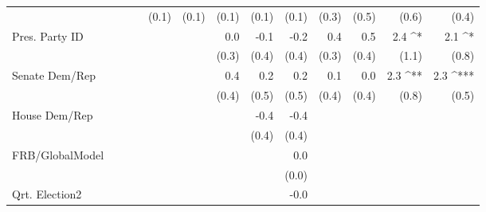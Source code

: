 \documentclass[a4paper]{article}\usepackage{graphicx, color}
\begin{document}
\begin{table}[ht]
\begin{center}
{\begin{tabular}{ l D{.}{.}{1}D{.}{.}{1}D{.}{.}{1}D{.}{.}{1}D{.}{.}{1}D{.}{.}{1}D{.}{.}{1}D{.}{.}{1}D{.}{.}{1}D{.}{.}{1}D{.}{.}{1}D{.}{.}{1} }
                     &                 &                 &                 & (0.1)           & (0.1)           & (0.1)           & (0.1)           & (0.1)           & (0.3)           & (0.5)           & (0.6)           & (0.4)          \\ 
Pres. Party ID       &                 &                 &                 &                 &                 & 0.0             & -0.1            & -0.2            & 0.4             & 0.5             & 2.4 ^*          & 2.1 ^*         \\ 
                     &                 &                 &                 &                 &                 & (0.3)           & (0.4)           & (0.4)           & (0.3)           & (0.4)           & (1.1)           & (0.8)          \\ 
Senate Dem/Rep       &                 &                 &                 &                 &                 & 0.4             & 0.2             & 0.2             & 0.1             & 0.0             & 2.3 ^{**}       & 2.3 ^{***}     \\ 
                     &                 &                 &                 &                 &                 & (0.4)           & (0.5)           & (0.5)           & (0.4)           & (0.4)           & (0.8)           & (0.5)          \\ 
House Dem/Rep        &                 &                 &                 &                 &                 &                 & -0.4            & -0.4            &                 &                 &                 &                \\ 
                     &                 &                 &                 &                 &                 &                 & (0.4)           & (0.4)           &                 &                 &                 &                \\ 
FRB/GlobalModel      &                 &                 &                 &                 &                 &                 &                 & 0.0             &                 &                 &                 &                \\ 
                     &                 &                 &                 &                 &                 &                 &                 & (0.0)           &                 &                 &                 &                \\ 
Qrt. Election2       &                 &                 &                 &                 &                 &                 &                 & -0.0            &                 &                 &                 &                \\ 

\end{tabular}}
\end{center}
\end{table}
\end{document}
